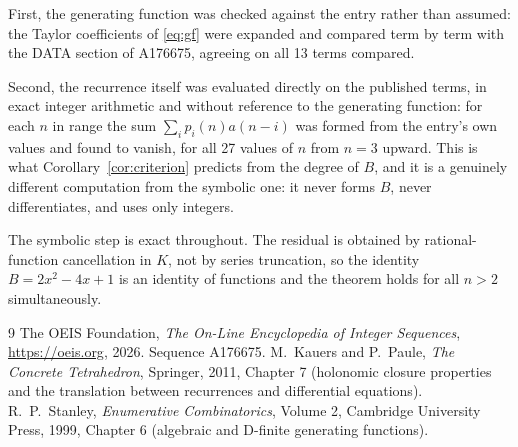 \documentclass[11pt,a4paper]{article}
\theoremstyle{plain}
\theoremstyle{definition}
\begin{document}
First, the generating function was checked against the entry rather than assumed: the
Taylor coefficients of \eqref{eq:gf} were expanded and compared term by term with the DATA
section of A176675, agreeing on all 13 terms compared.

Second, the recurrence itself was evaluated directly on the published terms, in exact
integer arithmetic and without reference to the generating function: for each $n$ in range
the sum $\sum_{i}p_{i}(n)a(n-i)$ was formed from the entry's own values and found to
vanish, for all 27 values of $n$ from $n=3$ upward. This is what
Corollary~\ref{cor:criterion} predicts from the degree of $B$, and it is a genuinely
different computation from the symbolic one: it never forms $B$, never differentiates, and
uses only integers.

The symbolic step is exact throughout. The residual is obtained by rational-function
cancellation in $K$, not by series truncation, so the identity $B=2 x^{2} - 4 x + 1$ is an
identity of functions and the theorem holds for all $n>2$ simultaneously.

\begin{thebibliography}{9}
 The OEIS Foundation, \emph{The On-Line Encyclopedia of Integer Sequences},
\url{https://oeis.org}, 2026. Sequence A176675.
 M.~Kauers and P.~Paule, \emph{The Concrete Tetrahedron}, Springer, 2011,
Chapter 7 (holonomic closure properties and the translation between recurrences and
differential equations).
 R.~P.~Stanley, \emph{Enumerative Combinatorics}, Volume 2, Cambridge
University Press, 1999, Chapter 6 (algebraic and D-finite generating functions).
\end{thebibliography}
\end{document}
